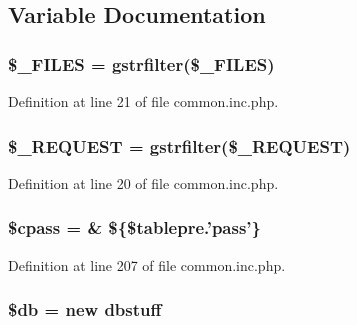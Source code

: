 \subsection{Variable Documentation}
\hypertarget{common_8inc_8php_a797c40bb61689e5072487a9a8d66843c}{
\subsubsection[{\$\+\_\+\+F\+I\+L\+E\+S}]{\setlength{\rightskip}{0pt plus 5cm}\$\+\_\+\+F\+I\+L\+E\+S = {\bf gstrfilter}(\$\+\_\+\+F\+I\+L\+E\+S)}}\label{common_8inc_8php_a797c40bb61689e5072487a9a8d66843c}


Definition at line 21 of file common.\+inc.\+php.

\hypertarget{common_8inc_8php_a0e4b7f3b6c609258c08660a1ec52b89b}{
\subsubsection[{\$\+\_\+\+R\+E\+Q\+U\+E\+S\+T}]{\setlength{\rightskip}{0pt plus 5cm}\$\+\_\+\+R\+E\+Q\+U\+E\+S\+T = {\bf gstrfilter}(\$\+\_\+\+R\+E\+Q\+U\+E\+S\+T)}}\label{common_8inc_8php_a0e4b7f3b6c609258c08660a1ec52b89b}


Definition at line 20 of file common.\+inc.\+php.

\hypertarget{common_8inc_8php_a6b49904a5083a3eee734e64e8a57e763}{
\subsubsection[{\$cpass}]{\setlength{\rightskip}{0pt plus 5cm}\$cpass = \& \$\{\$tablepre.'pass'\}}}\label{common_8inc_8php_a6b49904a5083a3eee734e64e8a57e763}


Definition at line 207 of file common.\+inc.\+php.

\hypertarget{common_8inc_8php_a1fa3127fc82f96b1436d871ef02be319}{
\subsubsection[{\$db}]{\setlength{\rightskip}{0pt plus 5cm}\$db = new {\bf dbstuff}}}\label{common_8inc_8php_a1fa3127fc82f96b1436d871ef02be319}


